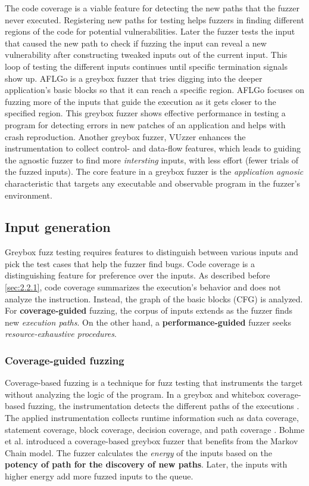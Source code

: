 The code coverage is a viable feature for detecting the new paths that the fuzzer never executed. Registering new paths for testing helps fuzzers in finding different regions of the code for potential vulnerabilities. Later the fuzzer tests the input that caused the new path to check if fuzzing the input can reveal a new vulnerability after constructing tweaked inputs out of the current input. This loop of testing the different inputs continues until specific termination signals show up. AFLGo \cite{bohme2017directed} is a greybox fuzzer that tries digging into the deeper application's basic blocks so that it can reach a specific region. AFLGo focuses on fuzzing more of the inputs that guide the execution as it gets closer to the specified region. This greybox fuzzer shows effective performance in testing a program for detecting errors in new patches of an application and helps with crash reproduction. Another greybox fuzzer, VUzzer \cite{rawat2017vuzzer} enhances the instrumentation to collect control- and data-flow features, which leads to guiding the agnostic fuzzer to find more \textit{intersting} inputs, with less effort (fewer trials of the fuzzed inputs). The core feature in a greybox fuzzer is the \textit{application agnosic} characteristic that targets any executable and observable program in the fuzzer's environment.

\subsection{Input generation}

Greybox fuzz testing requires features to distinguish between various inputs and pick the test cases that help the fuzzer find bugs. Code coverage is a distinguishing feature for preference over the inputs. As described before \ref{sec:2.2.1}, code coverage summarizes the execution's behavior and does not analyze the instruction. Instead, the graph of the basic blocks (CFG) is analyzed. For \textbf{coverage-guided} fuzzing, the corpus of inputs extends as the fuzzer finds new \textit{execution paths}. On the other hand, a \textbf{performance-guided} fuzzer seeks \textit{resource-exhaustive procedures}.

\subsubsection{Coverage-guided fuzzing}

Coverage-based fuzzing is a technique for fuzz testing that instruments the target without analyzing the logic of the program. In a greybox and whitebox coverage-based fuzzing, the instrumentation detects the different paths of the executions \cite{liang2018fuzzing}. The applied instrumentation collects runtime information such as data coverage, statement coverage, block coverage, decision coverage, and path coverage \cite{yang2009survey}. Bohme et al. \cite{bohme2017coverage} introduced a coverage-based greybox fuzzer that benefits from the Markov Chain model. The fuzzer calculates the \textit{energy} of the inputs based on the \textbf{potency of path for the discovery of new paths}. Later, the inputs with higher energy add more fuzzed inputs to the queue.


